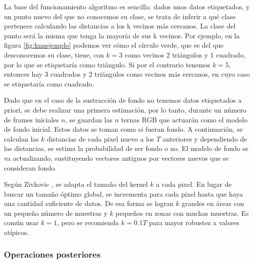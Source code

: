 La base del funcionamiento algoritmo es sencilla: dados unos datos etiquetados, y un punto nuevo del que no conocemos su clase, se trata de inferir a qué clase pertenece calculando las distancias a los k vecinos más cercanos. La clase del punto será la misma que tenga la mayoría de sus k vecinos. Por ejemplo, en la figura \ref{fig:knnejemplo} podemos ver cómo el círculo verde, que es del que desconocemos su clase, tiene, con $k=3$ como vecinos 2 triángulos y 1 cuadrado, por lo que se etiquetaría como triángulo. Si por el contrario tenemos $k=5$, entonces hay 3 cuadrados y 2 triángulos como vecinos más cercanos, en cuyo caso se etiquetaría como cuadrado.

Dado que en el caso de la sustracción de fondo no tenemos datos etiquetados a priori, se debe realizar una primera estimación, por lo tanto, durante un número de frames iniciales $n$, se guardan las $n$ ternas RGB que actuarán como el modelo de fondo inicial. Estos datos se toman como si fueran fondo. A continuación, se calculan las $k$ distancias de cada pixel nuevo a los $T$ anteriores y dependiendo de las distancias, se estima la probabilidad de ser fondo o no. El modelo de fondo se va actualizando, sustituyendo vectores antiguos por vectores nuevos que se consideran fondo.

Según Zivkovic \cite{art:Zivkovic2}, se adapta el tamaño del kernel $k$ a cada pixel. En lugar de buscar un tamaño óptimo global, se incrementa para cada pixel hasta que haya una cantidad suficiente de datos. De esa forma se logran $k$ grandes en áreas con un pequeño número de muestras y $k$ pequeños en zonas con muchas muestras. Es común usar $k=1$, pero se recomienda $k=0.1T$ para mayor robustez a valores atípicos.

\subsubsection*{Operaciones posteriores}

